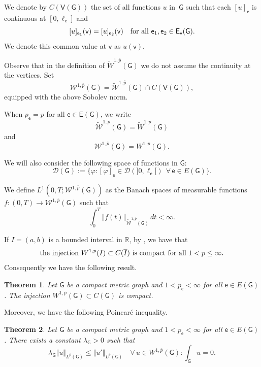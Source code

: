 \documentclass[reqno,12pt]{amsart}
\newtheorem{theorem}{Theorem}[section]
\def\R{\mathbb R} %
\newcommand{\norm}[1]{\left\Vert #1 \right\Vert} %
\def\e{\mathsf{e}} 	%
\def\v{\mathsf{v}}	%
\newcommand{\G}{\mathsf{G}}	%
\newcommand{\V}{\mathsf{V}}	%
\newcommand{\E}{\mathsf{E}}	%
\numberwithin{equation}{section} %
\begin{document}
 

We denote by $C(\V(\G))$ the set of all functions $u$ in~$\G$   such that each $[u]_\e$ is continuous at $[0,\ell_\e]$ and 
$$[u]_{\e_1}(\v)  = [u]_{\e_2}(\v) \quad \hbox{for all} \ \e_1, \e_2 \in \E_\v(\G).$$
We denote this common value at $\v$ as $u(\v)$.

Observe that in the definition of $\widetilde W^{1,\overline{p}}(\G)$ we do not assume the continuity at the vertices.
Set $$\mathcal{W}^{1,\overline{p}}(\G)= \widetilde{\mathcal{W}}^{1,\overline{p}}(\G)\cap C(\V(\G)),$$
equipped with the above Sobolev norm.

 When $p_\e = p$ for all  $\e\in \E(\G)$, we  write $$\widetilde{\mathcal{W}}^{1,\overline{p}}(\G)= \widetilde{W}^{1,p}(\G)$$
and $$\mathcal{W}^{1,\overline{p}}(\G)= W^{1,p}(\G).$$

We will also consider the following space of functions in $\G$:
$$\mathcal{D}(\G):= \{ \varphi   :   [\varphi]_\e \in \mathcal{D}(]0, \ell_\e[) \ \ \forall \, \e \in E(\G) \}.$$ 

  
We  define  $ L^{1}(0, T; \mathcal{W}^{1,\overline{p}}(\G))$ as the Banach spaces of  measurable functions $f : (0,T) \rightarrow  \mathcal{W}^{1,\overline{p}}(\G)$ such that
$$\int_0^T \norm{f(t)}_{\widetilde{\mathcal{W}}^{1,\overline{p}}(\G)} \, dt < \infty.$$
 

 If $I=(a,b)$ is a bounded interval in $\R$, by \cite[Theorem 8.8]{Bre10}, we have that
\begin{equation}\label{RC_001}
\hbox{the injection} \ W^{1,p}(I) \subset C(\overline{I}) \ \hbox{is compact for all} \ 1 < p \leq \infty.
\end{equation}
Consequently we have the following result.


\begin{theorem}\label{compact} 
Let $\G$  be a compact metric graph and $1 < p_\e <  \infty$ for all $\e\in E(\G)$. The injection $ W^{1,\overline{p}}(\G) \subset C(\G)$
is compact.  
\end{theorem}

Moreover, we have the following Poincaré inequality.

\begin{theorem}\label{teopoincare001}
Let $\G$  be a compact metric graph and $1 < p_\e <  \infty$ for all $\e \in E(\G)$. There exists a constant $\lambda_{\G} >0$ such that 
\begin{equation}\label{Poinc0}
\lambda_{\G}
\Vert u \Vert_{L^{\overline{p}}(\G)} \leq \Vert u' \Vert_{L^{\overline{p}}(\G)}   \quad \forall \, u \in W^{1,\overline{p}}(\G):\int_\G
u = 0.
\end{equation}
\end{theorem}
\end{document}
